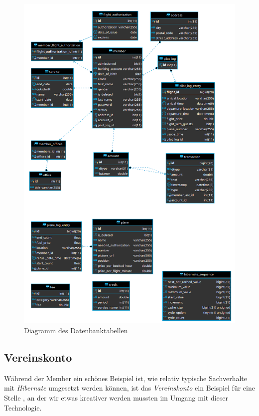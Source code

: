 \documentclass[a4paper, 11pt]{article}
\begin{document}
\begin{figure}[htpb]
    \centering
    \includegraphics[width=\textwidth]{images/erm/all.png}
    \caption{Diagramm des Datenbanktabellen}
    \label{fig:erm_all}
\end{figure}

\subsection{Vereinskonto}

Während der Member ein schönes Beispiel ist, wie relativ typische Sachverhalte
mit \emph{Hibernate} umgesetzt werden können, ist das \emph{Vereinskonto} ein Beispiel
für eine Stelle , an der wir etwas kreativer werden mussten im Umgang mit
dieser Technologie.
\end{document}
